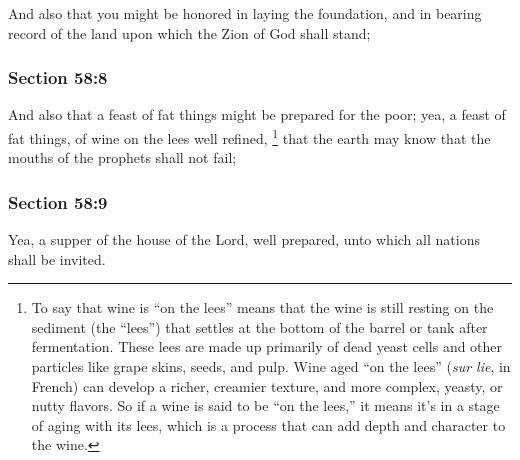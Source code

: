 		And also that you might be honored in laying the foundation, and in bearing record of the land upon which the Zion of God shall stand;


	\subsubsection{Section 58:8} %
		\label{DC58-8}

		And also that a feast of fat things might be prepared for the poor; yea, a feast of fat things, of wine on the lees well refined,%
			\footnote{%
				To say that wine is ``on the lees'' means that the wine is still resting on the sediment (the ``lees'') that settles at the bottom of the barrel or tank after fermentation. These lees are made up primarily of dead yeast cells and other particles like grape skins, seeds, and pulp. Wine aged ``on the lees'' (\textit{sur lie}, in French) can develop a richer, creamier texture, and more complex, yeasty, or nutty flavors. So if a wine is said to be ``on the lees,'' it means it's in a stage of aging with its lees, which is a process that can add depth and character to the wine.
				}
		that the earth may know that the mouths of the prophets shall not fail;


	\subsubsection{Section 58:9} %
		\label{DC58-9}

		Yea, a supper of the house of the Lord, well prepared, unto which all nations shall be invited.


